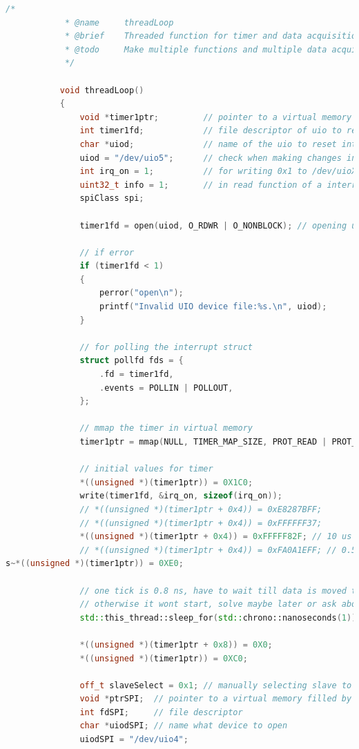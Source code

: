 \documentclass[a4paper, twoside, 11pt]{article}
\begin{document}
		\begin{lstlisting}[language={c++}, caption={threadLoop() funkce, běžící ve vlákně backgroundThread.}, label={lst:thread-loop-code}]
			/*
			* @name     threadLoop
			* @brief    Threaded function for timer and data acquisition.
			* @todo     Make multiple functions and multiple data acquisitions paralel but use data only when data from all sources all valid.
			*/
		   
		   void threadLoop()
		   {
			   void *timer1ptr;         // pointer to a virtual memory filled by mmap
			   int timer1fd;            // file descriptor of uio to reset interrupt in /proc/interrupts
			   char *uiod;              // name of the uio to reset interrupts
			   uiod = "/dev/uio5";      // check when making changes in a platform
			   int irq_on = 1;          // for writing 0x1 to /dev/uioX
			   uint32_t info = 1;       // in read function of a interrupt checking
			   spiClass spi;

			   timer1fd = open(uiod, O_RDWR | O_NONBLOCK); // opening uioX device
		   
			   // if error
			   if (timer1fd < 1)
			   {
				   perror("open\n");
				   printf("Invalid UIO device file:%s.\n", uiod);
			   }
		   
			   // for polling the interrupt struct
			   struct pollfd fds = {
				   .fd = timer1fd,
				   .events = POLLIN | POLLOUT,
			   };
		   
			   // mmap the timer in virtual memory
			   timer1ptr = mmap(NULL, TIMER_MAP_SIZE, PROT_READ | PROT_WRITE, MAP_SHARED, timer1fd, 0);
		   
			   // initial values for timer
			   *((unsigned *)(timer1ptr)) = 0X1C0;
			   write(timer1fd, &irq_on, sizeof(irq_on));
			   // *((unsigned *)(timer1ptr + 0x4)) = 0xE8287BFF;
			   // *((unsigned *)(timer1ptr + 0x4)) = 0xFFFFFF37;
			   *((unsigned *)(timer1ptr + 0x4)) = 0xFFFFF82F; // 10 us
			   // *((unsigned *)(timer1ptr + 0x4)) = 0xFA0A1EFF; // 0.5
s~*((unsigned *)(timer1ptr)) = 0XE0;
		   
			   // one tick is 0.8 ns, have to wait till data is moved to counter register
			   // otherwise it wont start, solve maybe later or ask about it
			   std::this_thread::sleep_for(std::chrono::nanoseconds(1));
		   
			   *((unsigned *)(timer1ptr + 0x8)) = 0X0;
			   *((unsigned *)(timer1ptr)) = 0XC0;
		   
			   off_t slaveSelect = 0x1; // manually selecting slave to make active
			   void *ptrSPI;  // pointer to a virtual memory filled by mmap
			   int fdSPI;     // file descriptor
			   char *uiodSPI; // name what device to open
			   uiodSPI = "/dev/uio4";
		   

\end{lstlisting}
\end{document}
